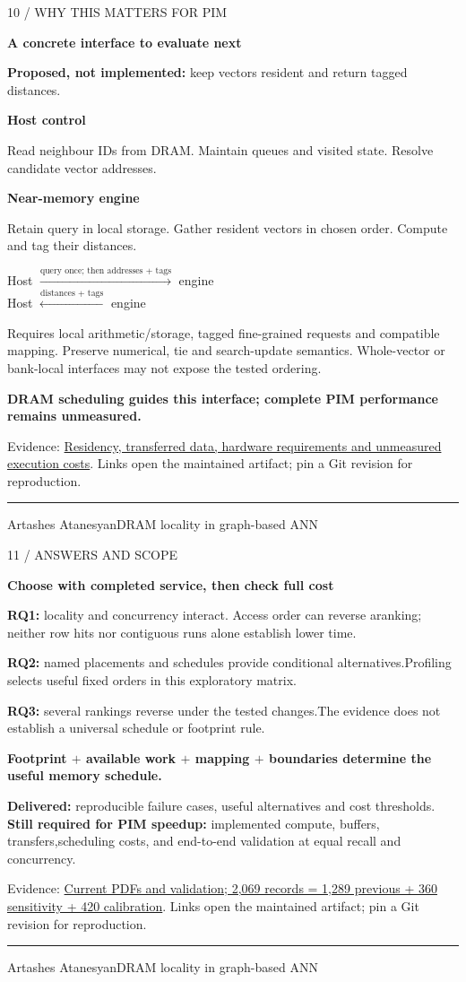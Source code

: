 \documentclass[11pt]{article}
\newenvironment{slide}[2]{%
  \clearpage\color{ink}\fontsize{14}{18}\selectfont
  {\fontsize{10}{12}\selectfont\color{accent}\MakeUppercase{#1}\par}
  {\fontsize{25}{29}\selectfont\bfseries #2\par}\vspace{4pt}
}{%
  \vfill{\color{accent}\hrule}\vspace{4pt}
  {\fontsize{9}{11}\selectfont\color{muted}Artashes Atanesyan\hfill DRAM locality in graph-based ANN\hfill\thepage\par}
}
\newcommand{\takeaway}[1]{\par\vspace{3pt}\colorbox{wash}{\parbox{\dimexpr\linewidth-2\fboxsep\relax}{\strut\textbf{#1}\strut}}\par}
\newcommand{\evidence}[2]{\vfill{\fontsize{9}{11}\selectfont\color{muted}Evidence: \href{https://github.com/senqx/Thesis-PIM-ANN/blob/main/#1}{#2}. Links open the maintained artifact; pin a Git revision for reproduction.\par}}
\begin{document}
\begin{slide}{10 / Why this matters for PIM}{A concrete interface to evaluate next}
\textbf{Proposed, not implemented:} keep vectors resident and return tagged distances.\par
\vspace{6pt}
\colorbox{wash}{\parbox[t]{0.44\linewidth}{\textbf{Host control}\par
Read neighbour IDs from DRAM.\newline
Maintain queues and visited state.\newline
Resolve candidate vector addresses.}}
\hfill
\colorbox{wash}{\parbox[t]{0.44\linewidth}{\textbf{Near-memory engine}\par
Retain query in local storage.\newline
Gather resident vectors in chosen order.\newline
Compute and tag their distances.}}
\begin{center}\fontsize{13}{17}\selectfont
Host $\xrightarrow{\text{query once; then addresses + tags}}$ engine\\[4pt]
Host $\xleftarrow{\text{distances + tags}}$ engine
\end{center}
{\fontsize{12}{16}\selectfont Requires local arithmetic/storage, tagged fine-grained requests and compatible mapping. Preserve numerical, tie and search-update semantics. Whole-vector or bank-local interfaces may not expose the tested ordering.\par}
\takeaway{DRAM scheduling guides this interface; complete PIM performance remains unmeasured.}
\evidence{doc/execution_sketch.tex}{Residency, transferred data, hardware requirements and unmeasured execution costs}
\end{slide}

\begin{slide}{11 / Answers and scope}{Choose with completed service, then check full cost}
\textbf{RQ1:} locality and concurrency interact. Access order can reverse a\newline ranking; neither row hits nor contiguous runs alone establish lower time.
\par\textbf{RQ2:} named placements and schedules provide conditional alternatives.\newline Profiling selects useful fixed orders in this exploratory matrix.
\par\textbf{RQ3:} several rankings reverse under the tested changes.\newline The evidence does not establish a universal schedule or footprint rule.
\takeaway{Footprint $+$ available work $+$ mapping $+$ boundaries determine the useful memory schedule.}
\textbf{Delivered:} reproducible failure cases, useful alternatives and cost thresholds.\newline
\textbf{Still required for PIM speedup:} implemented compute, buffers, transfers,\newline scheduling costs, and end-to-end validation at equal recall and concurrency.
\evidence{doc/VALIDATION.md}{Current PDFs and validation; 2,069 records = 1,289 previous + 360 sensitivity + 420 calibration}
\end{slide}
\end{document}
